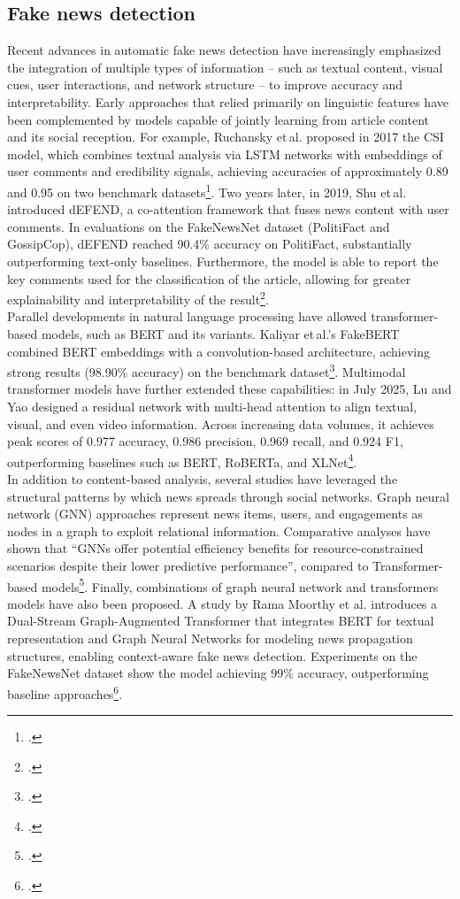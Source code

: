 \documentclass[a4paper,twoside,12pt]{book}
\begin{document}
	\subsection*{Fake news detection}
		Recent advances in automatic fake news detection have increasingly emphasized the integration of multiple types of information -- such as textual content, visual cues, user interactions, and network structure -- to improve accuracy and interpretability. Early approaches that relied primarily on linguistic features have been complemented by models capable of jointly learning from article content and its social reception. For example, Ruchansky et al. proposed in 2017 the CSI model, which combines textual analysis via LSTM networks with embeddings of user comments and credibility signals, achieving accuracies of approximately 0.89 and 0.95 on two benchmark datasets\footcite{ruchansky2017}. Two years later, in 2019, Shu et al. introduced dEFEND, a co-attention framework that fuses news content with user comments. In evaluations on the FakeNewsNet dataset (PolitiFact and GossipCop), dEFEND reached 90.4\% accuracy on PolitiFact, substantially outperforming text-only baselines. Furthermore, the model is able to report the key comments used for the classification of the article, allowing for greater explainability and interpretability of the result\footcite{shu2019}. \\
		Parallel developments in natural language processing have allowed transformer-based models, such as BERT and its variants. Kaliyar et al.’s FakeBERT combined BERT embeddings with a convolution-based architecture, achieving strong results (98.90\% accuracy) on the benchmark dataset\footcite{kaliyar2021}. Multimodal transformer models have further extended these capabilities: in July 2025, Lu and Yao designed a residual network with multi-head attention to align textual, visual, and even video information. Across increasing data volumes, it achieves peak scores of 0.977 accuracy, 0.986 precision, 0.969 recall, and 0.924 F1, outperforming baselines such as BERT, RoBERTa, and XLNet\footcite{lu2025}. \\
		
		In addition to content-based analysis, several studies have leveraged the structural patterns by which news spreads through social networks. Graph neural network (GNN) approaches represent news items, users, and engagements as nodes in a graph to exploit relational information. Comparative analyses have shown that \enquote{GNNs offer potential efficiency benefits for resource-constrained scenarios despite their lower predictive performance}, compared to Transformer-based models\footcite{kuntur2024}.  Finally, combinations of graph neural network and transformers models have also been proposed. A study by Rama Moorthy et al. introduces a Dual-Stream Graph-Augmented Transformer that integrates BERT for textual representation and Graph Neural Networks for modeling news propagation structures, enabling context-aware fake news detection. Experiments on the FakeNewsNet dataset show the model achieving 99\% accuracy, outperforming baseline approaches\footcite{ramamoorthy2025}.
		
\end{document}
